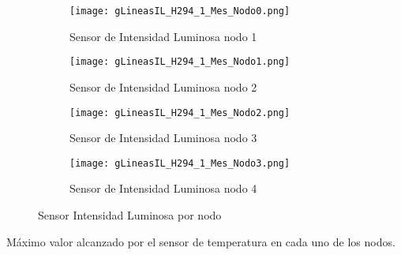 \documentclass{article}
\begin{document}
        \begin{figure}[h!]
            \centering\begin{subfigure}[h]{0.42\linewidth}
                                    \texttt{[image: gLineasIL\_H294\_1\_Mes\_Nodo0.png]}
                                    \caption{Sensor de Intensidad Luminosa nodo 1}
                                    \label{fig:IntL1}
                                \end{subfigure}
                                \begin{subfigure}[h]{0.42\linewidth}
                                    \texttt{[image: gLineasIL\_H294\_1\_Mes\_Nodo1.png]}
                                    \caption{Sensor de Intensidad Luminosa nodo 2}
                                    \label{fig:IntL2}
                                \end{subfigure}
                                \begin{subfigure}[h]{0.42\linewidth}
                                    \texttt{[image: gLineasIL\_H294\_1\_Mes\_Nodo2.png]}
                                    \caption{Sensor de Intensidad Luminosa nodo 3}
                                    \label{fig:IntL3}
                                \end{subfigure}
                                \begin{subfigure}[h]{0.42\linewidth}
                                    \texttt{[image: gLineasIL\_H294\_1\_Mes\_Nodo3.png]}
                                    \caption{Sensor de Intensidad Luminosa nodo 4}
                                    \label{fig:IntL4}
                                \end{subfigure}
                                \caption{Sensor Intensidad Luminosa por nodo}
            \label{fig:fig3}
        \end{figure}
        \newpage
        Máximo valor alcanzado por el sensor de temperatura en cada uno de los nodos.
\end{document}
